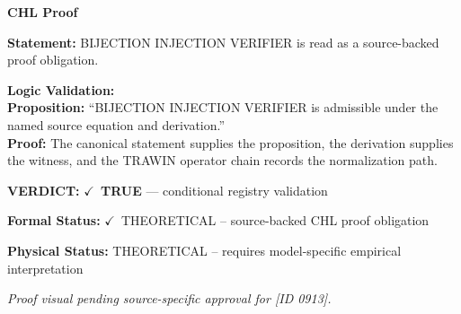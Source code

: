 \vspace{0.45em}
\noindent\textbf{CHL Proof}\par
\textbf{Statement:} BIJECTION INJECTION VERIFIER is read as a source-backed proof obligation.

\textbf{Logic Validation:}\\
\textbf{Proposition:} ``BIJECTION INJECTION VERIFIER is admissible under the named source equation and derivation.''\\
\textbf{Proof:} The canonical statement supplies the proposition, the derivation supplies the witness, and the TRAWIN operator chain records the normalization path.

\textbf{VERDICT:} \ensuremath{\checkmark}\ \textbf{TRUE} --- conditional registry validation

\textbf{Formal Status:} \ensuremath{\checkmark}\ THEORETICAL -- source-backed CHL proof obligation

\textbf{Physical Status:} THEORETICAL -- requires model-specific empirical interpretation
\par\vspace{0.45em}
\par
\vfill
\begingroup\footnotesize\itshape
Proof visual pending source-specific approval for [ID 0913].
\par\endgroup
\vfill
\endgroup
\endgroup
